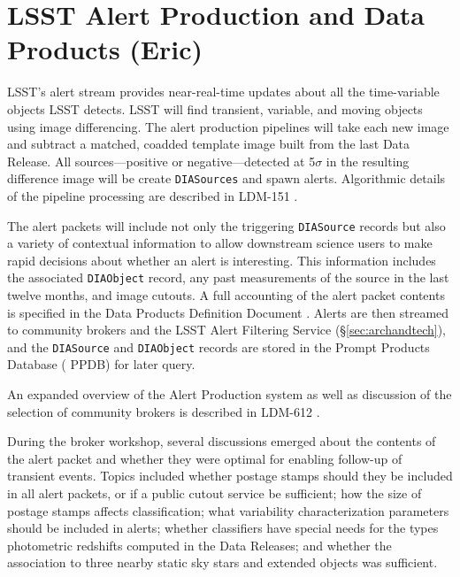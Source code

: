 \section{LSST Alert Production and Data Products (Eric)} \label{sec:alertproduction}

LSST's alert stream provides near-real-time updates about all the time-variable objects  {LSST} detects.
LSST will find transient, variable, and moving objects using image differencing.
The alert production pipelines will take each new image and subtract a matched, coadded template image built from the last Data Release.
All sources---positive or negative---detected at 5$\sigma$ in the resulting difference image will be create \texttt{DIASources} and spawn alerts.  
Algorithmic details of the pipeline processing are described in LDM-151 \citep{LDM-151}.

The alert packets will include not only the triggering \texttt{DIASource} records but also a variety of contextual information to allow downstream science users to make rapid decisions about whether an alert is interesting.
This information includes the associated \texttt{DIAObject} record, any past measurements of the source in the last twelve months, and image cutouts.  
A full accounting of the alert packet contents is specified in the Data Products Definition  {Document} \citep{LSE-163}.
Alerts are then streamed to community brokers and the  LSST Alert Filtering Service (\S \ref{sec:archandtech}), and the \texttt{DIASource} and \texttt{DIAObject} records are stored in the Prompt Products Database ( PPDB) for later query.

An expanded overview of the Alert Production system as well as discussion of the selection of community brokers is described in LDM-612 \citep{LDM-612}.

During the broker workshop, several discussions emerged about the contents of the alert packet and whether they were optimal for enabling follow-up of  {transient} events.
Topics included whether postage stamps should they be included in all alert packets, or if a public cutout service be sufficient; how the size of postage stamps affects classification; what variability characterization parameters should be included in alerts; whether classifiers have special needs for the types photometric redshifts computed in the Data Releases; and whether the association to three nearby static sky stars and extended objects was sufficient.

